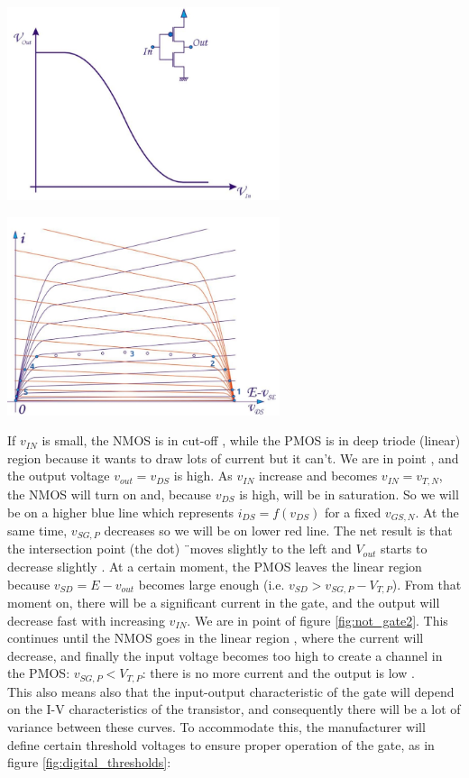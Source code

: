 \begin{minipage}{.5\textwidth}
	\centering
	\includegraphics[width=8cm]{figures/ch13/not_gate2.jpg}
	\label{fig:not_gate2b}
\end{minipage}%
\begin{minipage}{.5\textwidth}
	\centering
	\includegraphics[width=8cm]{figures/ch13/not_gate3.jpg}
	\label{fig:not_gate3}
\end{minipage}

If $v_{IN}$ is small, the NMOS is in cut-off , while the PMOS is in deep triode (linear) region because it wants to draw lots of current but it can't. We are in point , and the output voltage $v_{out} = v_{DS}$ is high. As $v_{IN}$ increase and becomes $v_{IN} = v_{T, N}$, the NMOS will turn on and, because $v_{DS}$ is high, will be in saturation. So we will be on a higher blue line which represents $i_{DS} = f(v_{DS})$ for a fixed $v_{GS, N}$. At the same time, $v_{SG, P}$ decreases so we will be on lower red line. The net result is that the intersection point (the dot) ¨moves slightly to the left and $V_{out}$ starts to decrease slightly . At a certain moment, the PMOS leaves the linear region because $v_{SD} = E - v_{out}$ becomes large enough (i.e. $v_{SD} > v_{SG,P} - V_{T,P}$). From that moment on, there will be a significant current in the gate, and the output will decrease fast with increasing $v_{IN}$. We are in point  of figure \ref{fig:not_gate2}. This continues until the NMOS goes in the linear region , where the current will decrease, and finally the input voltage becomes too high to create a channel in the PMOS: $v_{SG, P} < V_{T,P}$: there is no more current and the output is low . \\
This also means also that the input-output characteristic of the gate will depend on the I-V characteristics of the transistor, and consequently there will be a lot of variance between these curves. To accommodate this, the manufacturer will define certain threshold voltages to ensure proper operation of the gate, as in figure \ref{fig:digital_thresholds}:

